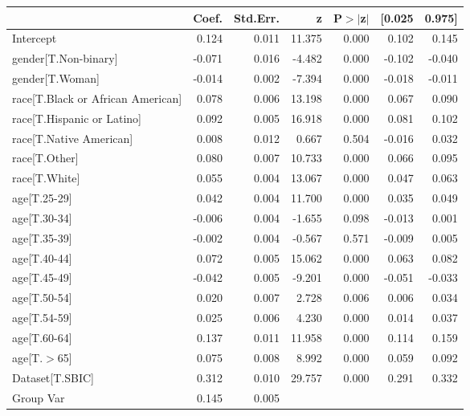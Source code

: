 \begin{table}
\begin{center}
\begin{tabular}{lrrrrrr}
\hline
                                  &  Coef. & Std.Err. &      z & P$> |$z$|$ & [0.025 & 0.975]  \\
\hline
Intercept                         &  0.124 &    0.011 & 11.375 &       0.000 &  0.102 &  0.145  \\
gender[T.Non-binary]              & -0.071 &    0.016 & -4.482 &       0.000 & -0.102 & -0.040  \\
gender[T.Woman]                   & -0.014 &    0.002 & -7.394 &       0.000 & -0.018 & -0.011  \\
race[T.Black or African American] &  0.078 &    0.006 & 13.198 &       0.000 &  0.067 &  0.090  \\
race[T.Hispanic or Latino]        &  0.092 &    0.005 & 16.918 &       0.000 &  0.081 &  0.102  \\
race[T.Native American]           &  0.008 &    0.012 &  0.667 &       0.504 & -0.016 &  0.032  \\
race[T.Other]                     &  0.080 &    0.007 & 10.733 &       0.000 &  0.066 &  0.095  \\
race[T.White]                     &  0.055 &    0.004 & 13.067 &       0.000 &  0.047 &  0.063  \\
age[T.25-29]                      &  0.042 &    0.004 & 11.700 &       0.000 &  0.035 &  0.049  \\
age[T.30-34]                      & -0.006 &    0.004 & -1.655 &       0.098 & -0.013 &  0.001  \\
age[T.35-39]                      & -0.002 &    0.004 & -0.567 &       0.571 & -0.009 &  0.005  \\
age[T.40-44]                      &  0.072 &    0.005 & 15.062 &       0.000 &  0.063 &  0.082  \\
age[T.45-49]                      & -0.042 &    0.005 & -9.201 &       0.000 & -0.051 & -0.033  \\
age[T.50-54]                      &  0.020 &    0.007 &  2.728 &       0.006 &  0.006 &  0.034  \\
age[T.54-59]                      &  0.025 &    0.006 &  4.230 &       0.000 &  0.014 &  0.037  \\
age[T.60-64]                      &  0.137 &    0.011 & 11.958 &       0.000 &  0.114 &  0.159  \\
age[T.$>$65]                      &  0.075 &    0.008 &  8.992 &       0.000 &  0.059 &  0.092  \\
Dataset[T.SBIC]                   &  0.312 &    0.010 & 29.757 &       0.000 &  0.291 &  0.332  \\
Group Var                         &  0.145 &    0.005 &        &             &        &         \\
\hline
\end{tabular}
\end{center}
\end{table}
\bigskip